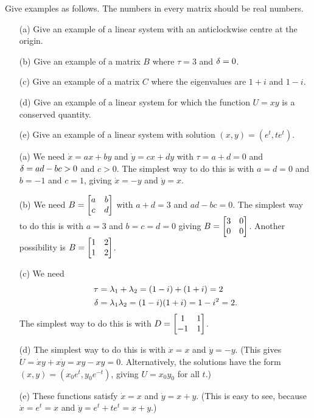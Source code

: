 \documentclass[a4paper]{amsart}
\begin{document}
\begin{exercise}\label{ex-linear-find-eg-b}
 Give examples as follows.  The numbers in every matrix
   should be real numbers.
   \begin{itemize}
    \item[(a)] Give an example of a linear system with an
     anticlockwise centre at the origin.
    \item[(b)] Give an example of a matrix $B$ where
     $\tau=3$ and $\delta=0$.
    \item[(c)] Give an example of a matrix $C$ where the eigenvalues
     are $1+i$ and $1-i$.
    \item[(d)] Give an example of a linear system for which the
     function $U=xy$ is a conserved quantity.
    \item[(e)] Give an example of a linear system with solution
     $(x,y)=(e^t,te^t)$. 
   \end{itemize}
\end{exercise}
\begin{solution}
 \begin{itemize}
  \item[(a)] We need $\dot{x}=ax+by$ and $\dot{y}=cx+dy$ with
   $\tau=a+d=0$ and $\delta=ad-bc>0$ and $c>0$.  The simplest way to do
   this is with $a=d=0$ and $b=-1$ and $c=1$, giving $\dot{x}=-y$
   and $\dot{y}=x$.  
  \item[(b)] We need $B=\left[\begin{matrix} a&b\\c&d\end{matrix}\right]$ with $a+d=3$ and
   $ad-bc=0$.  The simplest way to do this is with $a=3$ and
   $b=c=d=0$ giving $B=\left[\begin{matrix} 3&0\\ 0&0\end{matrix}\right]$.  Another possibility is
   $B=\left[\begin{matrix} 1&2\\1&2\end{matrix}\right]$.  
  \item[(c)] We need
   \begin{align*}
    \tau &= \lambda_1+\lambda_2 = (1-i) + (1+i) = 2 \\
    \delta &= \lambda_1\lambda_2 = (1-i)(1+i) = 1 - i^2 = 2.
   \end{align*}
   The simplest way to do this is with $D=\left[\begin{matrix} 1&1\\-1&1\end{matrix}\right]$.  
  \item[(d)] The simplest way to do this is with $\dot{x}=x$ and
   $\dot{y}=-y$.  (This gives $\dot{U}=\dot{x}y+x\dot{y}=xy-xy=0$.
   Alternatively, the solutions have the form
   $(x,y)=(x_0e^t,y_0e^{-t})$, giving $U=x_0y_0$ for all $t$.)
  \item[(e)] These functions satisfy $\dot{x}=x$ and $\dot{y}=x+y$. 
   (This is easy to see, because $\dot{x}=e^t=x$ and
   $\dot{y}=e^t+te^t=x+y$.)
 \end{itemize}
\end{solution}
  
\end{document}
